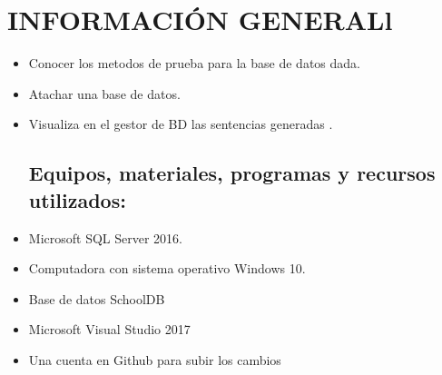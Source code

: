 \section{INFORMACIÓN GENERALl} 

\begin{itemize}
\subsection{Objetivos:}
	\item Conocer los metodos de prueba para la base de datos dada.
	\item Atachar una base de datos.
	\item Visualiza en el gestor de BD las sentencias generadas .


\subsection{Equipos, materiales, programas y recursos utilizados:}
	\item  Microsoft SQL Server 2016. 
	\item Computadora con sistema operativo Windows 10.
	\item Base de datos SchoolDB
	\item Microsoft Visual Studio 2017 
	\item Una cuenta en Github para subir los cambios


\end{itemize}

